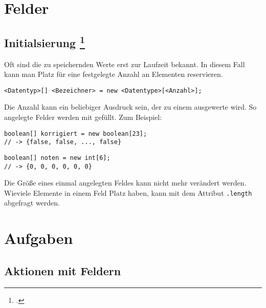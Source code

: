 \documentclass{lehramt-informatik}
\begin{document}

\chapter{Felder}

\section{Initialsierung
\footcite[Seite 46]{oomup:fs:3}}

Oft sind die zu speichernden Werte erst zur Laufzeit bekannt. In diesem
Fall kann man Platz für eine festgelegte Anzahl an Elementen
reservieren.

\texttt{<Datentyp>[] <Bezeichner> = new <Datentype>[<Anzahl>];}

Die Anzahl kann ein beliebiger Ausdruck sein, der zu einem 
ausgewerte wird. So angelegte Felder werden mit 
gefüllt. Zum Beispiel:

\begin{verbatim}
boolean[] korrigiert = new boolean[23];
// -> {false, false, ..., false}
\end{verbatim}

\begin{verbatim}
boolean[] noten = new int[6];
// -> {0, 0, 0, 0, 0, 0}
\end{verbatim}

Die Größe eines einmal angelegten Feldes kann nicht mehr verändert
werden. Wieviele Elemente in einem Feld Platz haben, kann mit dem
Attribut \texttt{.length} abgefragt werden.


\chapter{Aufgaben}

\section{Aktionen mit Feldern}
\end{document}

